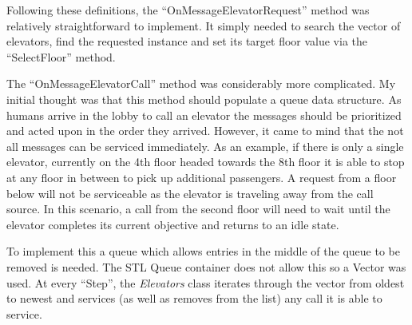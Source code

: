 \documentclass{article}
\begin{document}
Following these definitions, the ``OnMessageElevatorRequest'' method was relatively straightforward to implement. 
It simply needed to search the vector of elevators, find the requested instance and set its target floor value via the ``SelectFloor'' method.\newline

The ``OnMessageElevatorCall'' method was considerably more complicated. 
My initial thought was that this method should populate a queue data structure.
As humans arrive in the lobby to call an elevator the messages should be prioritized and acted upon in the order they arrived. 
However, it came to mind that the not all messages can be serviced immediately.
As an example, if there is only a single elevator, currently on the 4th floor headed towards the 8th floor it is able to stop at any floor in between to pick up additional passengers.
A request from a floor below will not be serviceable as the elevator is traveling away from the call source.
In this scenario, a call from the second floor will need to wait until the elevator completes its current objective and returns to an idle state. 

To implement this a queue which allows entries in the middle of the queue to be removed is needed.
The STL Queue container does not allow this so a Vector was used.
At every ``Step'', the \textit{Elevators} class iterates through the vector from oldest to newest and services (as well as removes from the list) any call it is able to service.\newline
\end{document}
